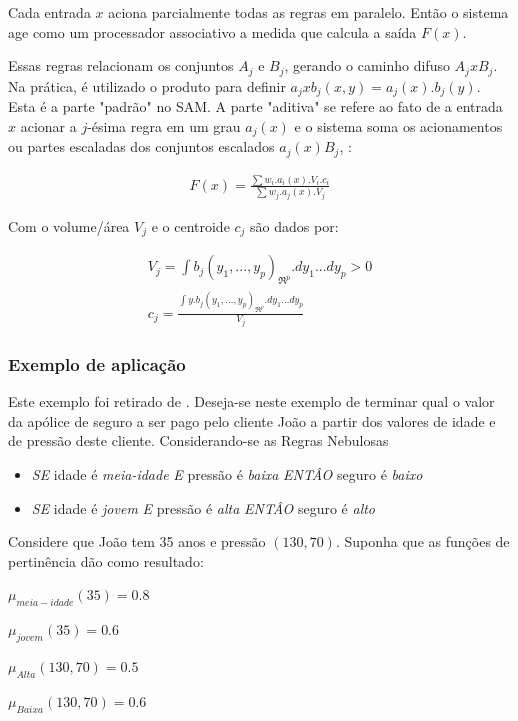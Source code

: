 Cada entrada $x$ aciona parcialmente todas as regras em paralelo. Então o sistema age como um processador 
associativo a medida que calcula a saída $F(x)$.

Essas regras relacionam os conjuntos $A_j$ e $B_j$, gerando o caminho difuso $A_j x B_j$. Na prática,
é utilizado o produto para definir $ a_j x b_j (x,y) = a_j(x).b_j(y)$. Esta é a parte "padrão" no SAM.
A parte "aditiva" se refere ao fato de a entrada $x$ acionar a $j$-ésima regra em um grau $a_j(x)$ e o sistema 
soma os acionamentos ou partes escaladas dos conjuntos escalados $a_j(x)B_j$, \cite{kosko1997fuzzy}:

\begin{eqnarray}
F(x) = \frac{\sum w_i.a_i(x).V_i.c_i}{\sum w_j.a_j(x).V_j}
\end{eqnarray}

Com o volume/área $V_j$ e o centroide $c_j$ são dados por:

\begin{eqnarray}
V_j = \int{b_j(y_1,...,y_p)}_{\Re^{p}}.dy_1...dy_p > 0\\
c_j = \frac{\int{y.b_j(y_1,...,y_p)}_{\Re^{p}}.dy_1...dy_p}{V_j}
\end{eqnarray}

\subsubsection{Exemplo de aplicação}
 Este exemplo foi retirado de \cite{passos2005datamining}. Deseja-se neste exemplo de terminar qual o valor da
 apólice de seguro a ser pago pelo cliente João a partir dos valores de idade e de pressão deste cliente.
 Considerando-se as Regras Nebulosas
 \begin{itemize}
   \item \emph{SE} idade é \textit{meia-idade} \emph{E} pressão é \textit{baixa} \emph{ENTÂO} seguro é \textit{baixo}
   \item \emph{SE} idade é \textit{jovem} \emph{E} pressão é \textit{alta} \emph{ENTÂO} seguro é \textit{alto}
 \end{itemize}
 
 Considere que João tem 35 anos e pressão $(130,70)$. Suponha que as funções de pertinência dão como resultado:
 \begin{description}
   \item $\mu_{meia-idade} (35) = 0.8$
   \item $\mu_{jovem} (35) = 0.6$
   \item $\mu_{Alta}(130,70) = 0.5$
   \item $\mu_{Baixa}(130,70) = 0.6$
 \end{description}
 
